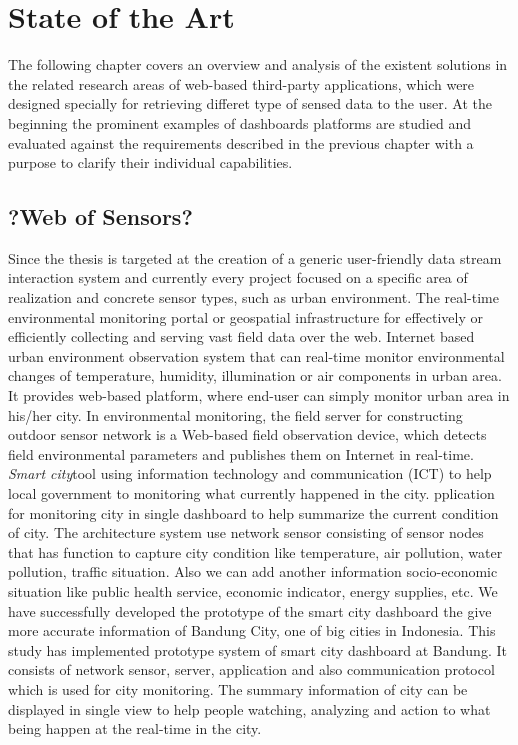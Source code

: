 \chapter{State of the Art}
The following chapter covers an overview and analysis of the existent solutions in
the related research areas of web-based third-party applications, which were designed specially for retrieving differet type of sensed data to the user. At the beginning the prominent examples of dashboards platforms are studied and evaluated against the requirements described in the previous chapter with a purpose to clarify their individual capabilities.

\section{?Web of Sensors?}
 Since the thesis is targeted at the creation of a generic user-friendly data stream interaction system and currently every project focused on a specific area of realization and concrete sensor types, such as urban environment\cite{song2010real}. The real-time environmental monitoring portal or geospatial infrastructure for effectively or  efficiently collecting and serving vast field data over the web. Internet based urban environment observation system that can real-time monitor environmental changes of temperature, humidity, illumination or air components in urban area. It provides web-based platform, where end-user can simply monitor urban area in his/her city. In environmental monitoring, the field server for constructing outdoor sensor network is a Web-based field observation device, which detects field environmental parameters and publishes them on Internet in real-time.
\newline
	\emph{Smart city}\cite{6588063}tool using information technology and communication (ICT) to help local government to monitoring what currently happened in the city. pplication for monitoring city in single dashboard to help summarize the current condition of city. The architecture system use network sensor consisting of sensor nodes that has function to capture city condition like temperature, air pollution, water pollution, traffic situation. Also we can add another information socio-economic situation like public health service, economic indicator, energy supplies, etc. We have successfully developed the prototype of the smart city dashboard the give more accurate information of Bandung City, one of big cities in Indonesia. This study has implemented prototype system of smart city dashboard at Bandung. It consists of network sensor, server, application and also communication protocol which is used for city monitoring. The summary information of city can be displayed in single view to help people watching, analyzing and action to what being happen at the real-time in the city.
